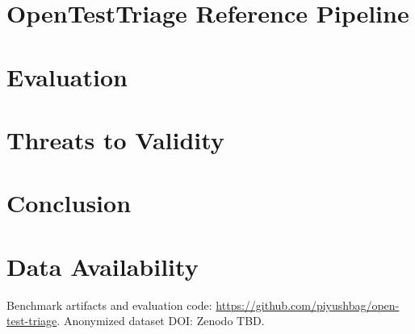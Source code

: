 \documentclass[conference]{IEEEtran}
\begin{document}
\section{OpenTestTriage Reference Pipeline}
\label{sec:pipeline}

\section{Evaluation}
\label{sec:eval}

\section{Threats to Validity}
\label{sec:threats}

\section{Conclusion}
\label{sec:conclusion}

\section*{Data Availability}
Benchmark artifacts and evaluation code: \url{https://github.com/piyushbag/open-test-triage}.
Anonymized dataset DOI: Zenodo TBD.



\end{document}
